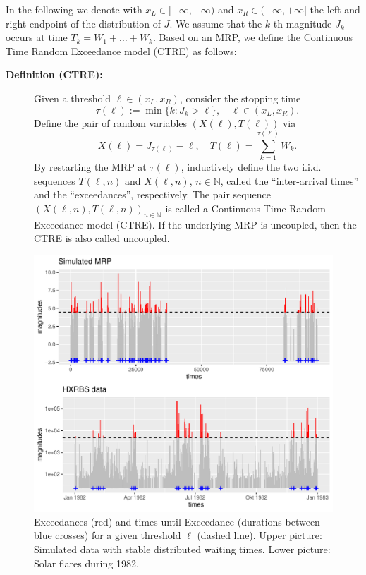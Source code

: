 \documentclass[]{elsarticle} %
\begin{document}
In the following we denote with \(x_L \in [-\infty, +\infty)\) and
\(x_R \in (-\infty, +\infty]\) the left and right endpoint of the
distribution of \(J\). We assume that the \(k\)-th magnitude \(J_k\)
occurs at time \(T_k = W_1 + \ldots + W_k\). Based on an MRP, we define
the Continuous Time Random Exceedance model (CTRE) as follows:

\begin{description}
\item[\textbf{Definition (CTRE):}]
Given a threshold \(\ell \in (x_L, x_R)\), consider the stopping time
\[\tau(\ell) := \min\{k: J_k > \ell\},\quad \ell \in (x_L, x_R).\]
Define the pair of random variables \((X(\ell), T(\ell))\) via
\[X(\ell) = J_{\tau(\ell)} - \ell, \quad 
T(\ell) = \sum_{k=1}^{\tau(\ell)} W_k.\] By restarting the MRP at
\(\tau(\ell)\), inductively define the two i.i.d. sequences
\(T(\ell,n)\) and \(X(\ell, n)\), \(n \in \mathbb N\), called the
``inter-arrival times'' and the ``exceedances'', respectively. The pair
sequence \((X(\ell, n), T(\ell, n))_{n \in \mathbb N}\) is called a
Continuous Time Random Exceedance model (CTRE). If the underlying MRP is
uncoupled, then the CTRE is also called uncoupled.
\end{description}

\begin{figure}

{\centering \includegraphics[width=0.7\linewidth]{article_springer_files/figure-latex/thresholdedBursty-1} 

}

\caption{\label{fig:thresholdedBursty} Exceedances (red) and times until Exceedance (durations between blue crosses) for a given threshold $\ell$ (dashed line). Upper picture: Simulated data with stable distributed waiting times. Lower picture: Solar flares during 1982.}\label{fig:thresholdedBursty}
\end{figure}
\end{document}
